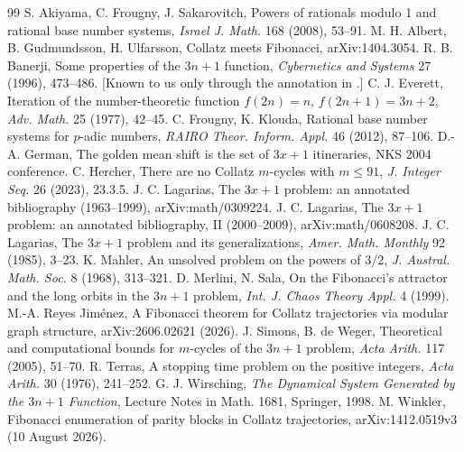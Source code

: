 \documentclass[11pt]{article}
\begin{document}
\begin{thebibliography}{99}\small
{} S. Akiyama, C. Frougny, J. Sakarovitch, Powers of rationals modulo 1 and rational base number systems,
\emph{Israel J. Math.} 168 (2008), 53--91.
 M. H. Albert, B. Gudmundsson, H. Ulfarsson, Collatz meets Fibonacci, arXiv:1404.3054.
 R. B. Banerji, Some properties of the $3n+1$ function, \emph{Cybernetics and Systems} 27 (1996),
473--486. [Known to us only through the annotation in \cite{La1}.]
 C. J. Everett, Iteration of the number-theoretic function $f(2n)=n$, $f(2n+1)=3n+2$, \emph{Adv.
Math.} 25 (1977), 42--45.
 C. Frougny, K. Klouda, Rational base number systems for $p$-adic numbers, \emph{RAIRO Theor. Inform.
Appl.} 46 (2012), 87--106.
 D.-A. German, The golden mean shift is the set of $3x+1$ itineraries, NKS 2004 conference.
 C. Hercher, There are no Collatz $m$-cycles with $m\le91$, \emph{J. Integer Seq.} 26 (2023), 23.3.5.
 J. C. Lagarias, The $3x+1$ problem: an annotated bibliography (1963--1999), arXiv:math/0309224.
 J. C. Lagarias, The $3x+1$ problem: an annotated bibliography, II (2000--2009), arXiv:math/0608208.
 J. C. Lagarias, The $3x+1$ problem and its generalizations, \emph{Amer. Math. Monthly} 92 (1985), 3--23.
 K. Mahler, An unsolved problem on the powers of $3/2$, \emph{J. Austral. Math. Soc.} 8 (1968), 313--321.
 D. Merlini, N. Sala, On the Fibonacci's attractor and the long orbits in the $3n+1$ problem,
\emph{Int. J. Chaos Theory Appl.} 4 (1999).
 M.-A. Reyes Jim\'enez, A Fibonacci theorem for Collatz trajectories via modular graph structure,
arXiv:2606.02621 (2026).
 J. Simons, B. de Weger, Theoretical and computational bounds for $m$-cycles of the $3n+1$ problem,
\emph{Acta Arith.} 117 (2005), 51--70.
 R. Terras, A stopping time problem on the positive integers, \emph{Acta Arith.} 30 (1976), 241--252.
 G. J. Wirsching, \emph{The Dynamical System Generated by the $3n+1$ Function}, Lecture Notes in Math.
1681, Springer, 1998.
 M. Winkler, Fibonacci enumeration of parity blocks in Collatz trajectories, arXiv:1412.0519v3
(10 August 2026).
\end{thebibliography}
\end{document}
